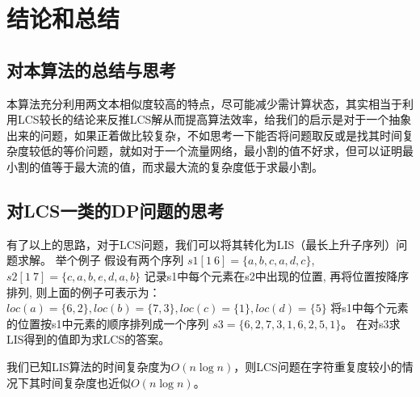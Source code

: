 \chapter{结论和总结}
\section{对本算法的总结与思考}
本算法充分利用两文本相似度较高的特点，尽可能减少需计算状态，其实相当于利用LCS较长的结论来反推LCS解从而提高算法效率，给我们的启示是对于一个抽象出来的问题，如果正着做比较复杂，不如思考一下能否将问题取反或是找其时间复杂度较低的等价问题，就如对于一个流量网络，最小割的值不好求，但可以证明最小割的值等于最大流的值，而求最大流的复杂度低于求最小割。
\section{对LCS一类的DP问题的思考}
有了以上的思路，对于LCS问题，我们可以将其转化为LIS（最长上升子序列）问题求解。
举个例子
假设有两个序列
$s1[1~6]=\{a,b,c,a,d,c\}$, $s2[1~7]=\{c,a,b,e,d,a,b\}$
记录s1中每个元素在s2中出现的位置, 再将位置按降序排列, 则上面的例子可表示为：
$loc(a)=\{6,2\}, loc(b)=\{7,3\},loc(c)=\{1\},loc(d)=\{5\}$
将s1中每个元素的位置按s1中元素的顺序排列成一个序列
$s3=\{6,2,7,3,1,6,2,5,1\}$。
在对s3求LIS得到的值即为求LCS的答案。
\par
我们已知LIS算法的时间复杂度为$O(n\log n)$，则LCS问题在字符重复度较小的情况下其时间复杂度也近似$O(n\log n)$\cite{Kuo1989An}。
